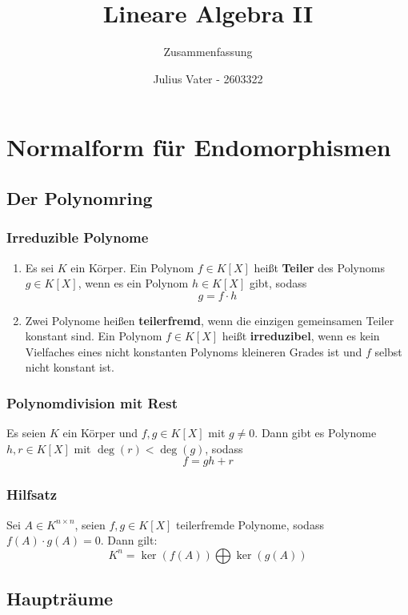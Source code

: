 \documentclass{kit}
\author{Julius Vater - 2603322}
\title{Lineare Algebra II}
\subtitle{Zusammenfassung}
\begin{document}
\maketitle
\tableofcontents
\pagebreak
\setcounter{section}{8}
\section{Normalform für Endomorphismen}
  \subsection{Der Polynomring}
    \subsubsection{Irreduzible Polynome}
      \begin{enumerate}
        \item Es sei $K$ ein Körper. Ein Polynom $f\in K[X]$ heißt \textbf{Teiler} des Polynoms $g\in K[X]$, wenn es ein
          Polynom $h\in K[X]$ gibt, sodass
          $$g=f\cdot h$$
        \item Zwei Polynome heißen \textbf{teilerfremd}, wenn die einzigen gemeinsamen Teiler konstant sind.
          Ein Polynom $f\in K[X]$ heißt \textbf{irreduzibel}, wenn es kein Vielfaches eines nicht konstanten Polynoms
          kleineren Grades ist und $f$ selbst nicht konstant ist.
      \end{enumerate}
    \subsubsection{Polynomdivision mit Rest}
      Es seien $K$ ein Körper und $f,g\in K[X]$ mit $g\neq0$. Dann gibt es Polynome $h,r\in K[X]$ mit $\deg(r)<\deg(g)$,
      sodass
      $$f=gh+r$$
    \subsubsection{Hilfsatz}
      Sei $A\in K^{n\times n}$, seien $f,g\in K[X]$ teilerfremde Polynome, sodass $f(A)\cdot g(A)=0$. Dann gilt:
      $$K^n=\ker(f(A))\bigoplus\ker(g(A))$$
  \subsection{Haupträume}
\end{document}
